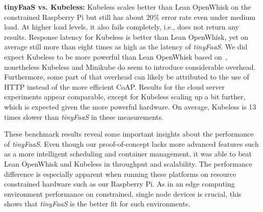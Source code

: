 \textbf{tinyFaaS vs. Kubeless:} Kubeless scales better than Lean OpenWhisk on the constrained Raspberry Pi but still has about 20\% error rate even under medium load.
At higher load levels, it also fails completely, i.e., does not return any results.
Response latency for Kubeless is better than Lean OpenWhisk, yet on average still more than eight times as high as the latency of \textit{tinyFaaS}.
We did expect Kubeless to be more powerful than Lean OpenWhisk based on~\cite{Palade2019-mo}, nonetheless Kubeless and Minikube do seem to introduce considerable overhead.
Furthermore, some part of that overhead can likely be attributed to the use of HTTP instead of the more efficient CoAP.
Results for the cloud server experiments appear comparable, except for Kubeless scaling up a bit further, which is expected given the more powerful hardware.
On average, Kubeless is 13 times slower than \textit{tinyFaaS} in these measurements.

These benchmark results reveal some important insights about the performance of \textit{tinyFaaS}.
Even though our proof-of-concept lacks more advanced features such as a more intelligent scheduling and container management, it was able to beat Lean OpenWhisk and Kubeless in throughput and scalability.
The performance difference is especially apparent when running these platforms on resource constrained hardware such as our Raspberry Pi.
As in an edge computing environment performance on constrained, single node devices is crucial, this shows that \textit{tinyFaaS} is the better fit for such environments.
